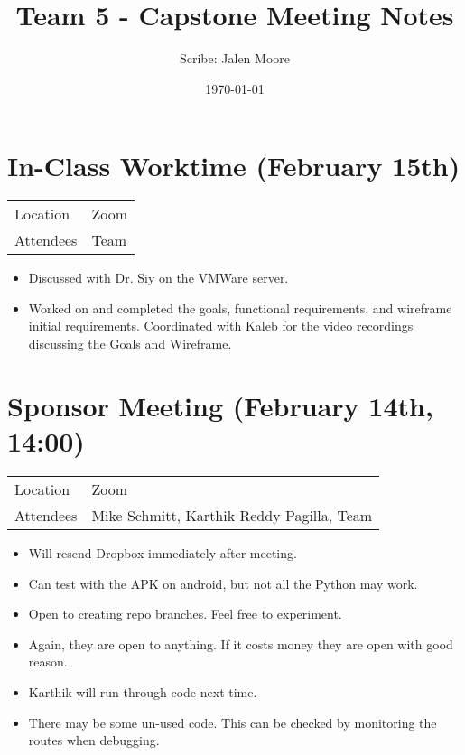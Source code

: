 \documentclass[a4paper, 10pt]{article}
\author{Scribe: Jalen Moore}
\date{\today}
\title{Team 5 - Capstone Meeting Notes}
\begin{document}
\maketitle
\tableofcontents

\section{In-Class Worktime (February 15th)}
\label{sec:orgbcbce95}

\begin{center}
\begin{tabular}{ll}
Location & Zoom\\
Attendees & Team\\
\end{tabular}
\end{center}

\begin{itemize}
\item Discussed with Dr. Siy on the VMWare server.
\item Worked on and completed the goals, functional requirements, and wireframe initial requirements. Coordinated with Kaleb for the video recordings discussing the Goals and Wireframe.
\end{itemize}
\section{Sponsor Meeting (February 14th, 14:00)}
\label{sec:orge2d7369}

\begin{center}
\begin{tabular}{ll}
Location & Zoom\\
Attendees & Mike Schmitt, Karthik Reddy Pagilla, Team\\
\end{tabular}
\end{center}

\begin{itemize}
\item Will resend Dropbox immediately after meeting.
\item Can test with the APK on android, but not all the Python may work.
\item Open to creating repo branches. Feel free to experiment.
\item Again, they are open to anything. If it costs money they are open with good reason.
\item Karthik will run through code next time.
\item There may be some un-used code. This can be checked by monitoring the routes when debugging.
\end{itemize}
\end{document}

